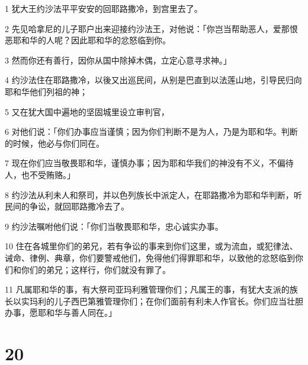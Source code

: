 \par 1 犹大王约沙法平平安安的回耶路撒冷，到宫里去了。
\par 2 先见哈拿尼的儿子耶户出来迎接约沙法王，对他说：「你岂当帮助恶人，爱那恨恶耶和华的人呢？因此耶和华的忿怒临到你。
\par 3 然而你还有善行，因你从国中除掉木偶，立定心意寻求神。」
\par 4 约沙法住在耶路撒冷，以後又出巡民间，从别是巴直到以法莲山地，引导民归向耶和华他们列祖的神；
\par 5 又在犹大国中遍地的坚固城里设立审判官，
\par 6 对他们说：「你们办事应当谨慎；因为你们判断不是为人，乃是为耶和华。判断的时候，他必与你们同在。
\par 7 现在你们应当敬畏耶和华，谨慎办事；因为耶和华我们的神没有不义，不偏待人，也不受贿赂。」
\par 8 约沙法从利未人和祭司，并以色列族长中派定人，在耶路撒冷为耶和华判断，听民间的争讼，就回耶路撒冷去了。
\par 9 约沙法嘱咐他们说：「你们当敬畏耶和华，忠心诚实办事。
\par 10 住在各城里你们的弟兄，若有争讼的事来到你们这里，或为流血，或犯律法、诫命、律例、典章，你们要警戒他们，免得他们得罪耶和华，以致他的忿怒临到你们和你们的弟兄；这样行，你们就没有罪了。
\par 11 凡属耶和华的事，有大祭司亚玛利雅管理你们；凡属王的事，有犹大支派的族长以实玛利的儿子西巴第雅管理你们；在你们面前有利未人作官长。你们应当壮胆办事，愿耶和华与善人同在。」

\chapter{20}

